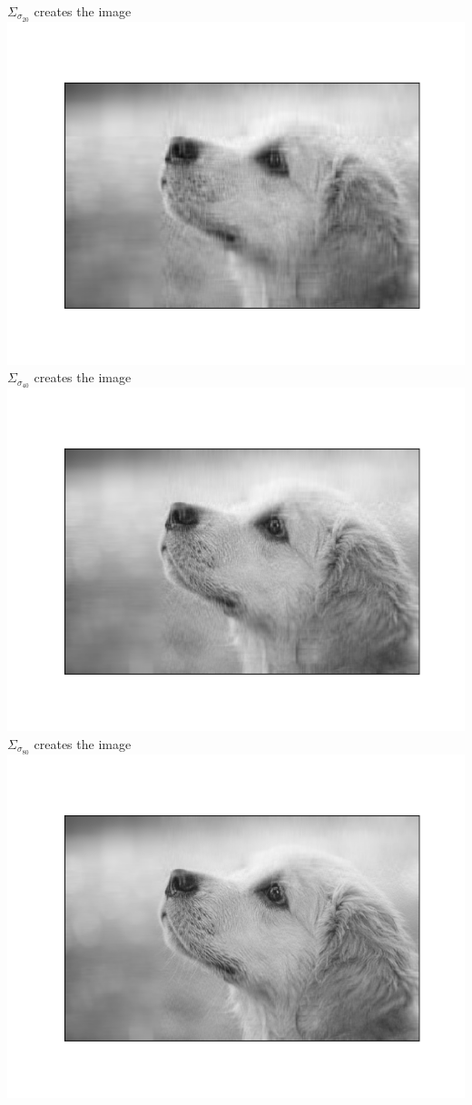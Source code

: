 \documentclass[12pt]{article}
\begin{document}
		$\Sigma_{\sigma_{20}}$ creates the image \\
		\includegraphics[scale=0.8]{part1/prob_a/Figure_1} \\
		$\Sigma_{\sigma_{40}}$ creates the image \\
		\includegraphics[scale=0.8]{part1/prob_a/Figure_2} \\
\newpage
		$\Sigma_{\sigma_{80}}$ creates the image \\
		\includegraphics[scale=0.8]{part1/prob_a/Figure_3} \\
\end{document}
